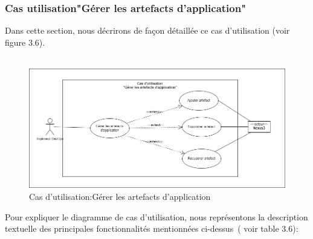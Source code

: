       \subsubsection{\Large Cas utilisation"Gérer les artefacts d'application"}
         \textsf{\selectfont{}
         Dans cette section, nous décrirons de façon détaillée ce cas d'utilisation (voir figure 3.6).\\\texttt{}\\[0.01cm]
         }
         \begin{figure}[H]
          \begin{center}
          
              \includegraphics[width=15cm]{Usecase6.drawio.png}
        
          \end{center}
          
          \caption{Cas d'utilisation:Gérer les artefacts d'application}
        \end{figure}
         \textsf{\selectfont{}
         Pour expliquer  le diagramme de cas d’utilisation, nous représentons la description textuelle des principales fonctionnalités mentionnées ci-dessus ( voir table 3.6): \\}
